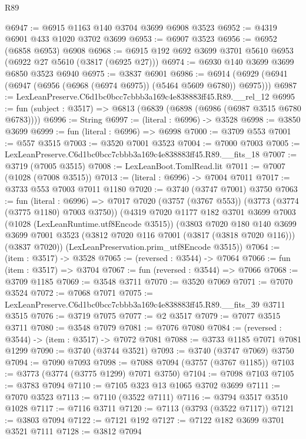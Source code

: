 \begin{lexlean}{R89}
\begin{coremodule}
@6947 := @6915 @1163 @140 @3704 @3699 @6908 @3523
@6952 := @4319 @6901 @433 @1020 @3702 @3699
@6953 := @6907 @3523
@6956 := @6952 (@6858 @6953) @6908
@6968 := @6915 @192 @692 @3699 @3701 @5610 @6953 (@6922 @27 @5610 (@3817 (@6925 @27)))
@6974 := @6930 @140 @3699 @3699 @6850 @3523 @6940
@6975 := @3837 @6901
@6986 := @6914 (@6929 (@6941 (@6947 (@6956 (@6968 (@6974 @6975)) (@5464 @5609 @6780)) @6975)))
@6987 := LexLeanPreserve.C6d1bc0bcc7cbbb3a169c4e838883ff45.R89.__rel_12
@6995 := fun (subject : @3517) => @6813 (@6839 (@6898 (@6986 (@6987 @3515 @6780 @6783))))
@6996 := String
@6997 := (literal : @6996) -> @3528
@6998 := @3850 @3699
@6999 := fun (literal : @6996) => @6998
@7000 := @3709 @553
@7001 := @557 @3515
@7003 := @3520 @7001 @3523
@7004 := @7000 @7003
@7005 := LexLeanPreserve.C6d1bc0bcc7cbbb3a169c4e838883ff45.R89.__fits_18
@7007 := @3719 (@7005 @3515)
@7008 := LexLeanBoot.TomlRead.lit
@7011 := @7007 (@1028 (@7008 @3515))
@7013 := (literal : @6996) -> @7004 @7011
@7017 := @3733 @553 @7003 @7011 @1180
@7020 := @3740 (@3747 @7001) @3750
@7063 := fun (literal : @6996) =>
  @7017
    @7020
    (@3757 (@3767 @553))
    (@3773 (@3774 (@3775 @1180) @7003 @3750))
    (@4319
      @7020
      @1177
      @182
      @3701
      @3699
      @7003
      (@1028 (LexLeanRuntime.utf8Encode @3515))
      (@3803
        @7020
        @180
        @140
        @3699
        @3699
        @7001
        @3523
        (@3812 @7020 @116 @7001 (@3817 (@3818 @7020 @116)))
        (@3837 @7020))
      (LexLeanPreservation.prim_utf8Encode @3515))
@7064 := (item : @3517) -> @3528
@7065 := (reversed : @3544) -> @7064
@7066 := fun (item : @3517) => @3704
@7067 := fun (reversed : @3544) => @7066
@7068 := @3709 @1185
@7069 := @3548 @3711
@7070 := @3520 @7069
@7071 := @7070 @3524
@7072 := @7068 @7071
@7075 := LexLeanPreserve.C6d1bc0bcc7cbbb3a169c4e838883ff45.R89.__fits_39 @3711 @3515
@7076 := @3719 @7075
@7077 := @2 @3517
@7079 := @7077 @3515 @3711
@7080 := @3548 @7079
@7081 := @7076 @7080
@7084 := (reversed : @3544) -> (item : @3517) -> @7072 @7081
@7088 := @3733 @1185 @7071 @7081 @1299
@7090 := @3740 (@3744 @3521)
@7093 := @3740 (@3747 @7069) @3750
@7094 := @7090 @7093
@7098 := @7088 @7094 (@3757 (@3767 @1185))
@7103 := @3773 (@3774 (@3775 @1299) @7071 @3750)
@7104 := @7098 @7103
@7105 := @3783 @7094
@7110 := @7105 @323 @13 @1065 @3702 @3699
@7111 := @7070 @3523
@7113 := @7110 (@3522 @7111)
@7116 := @3794 @3517 @3510 @1028
@7117 := @7116 @3711
@7120 := @7113 (@3793 (@3522 @7117))
@7121 := @3803 @7094
@7122 := @7121 @192
@7127 := @7122 @182 @3699 @3701 @3521 @7111
@7128 := @3812 @7094

\end{coremodule}
\end{lexlean}
